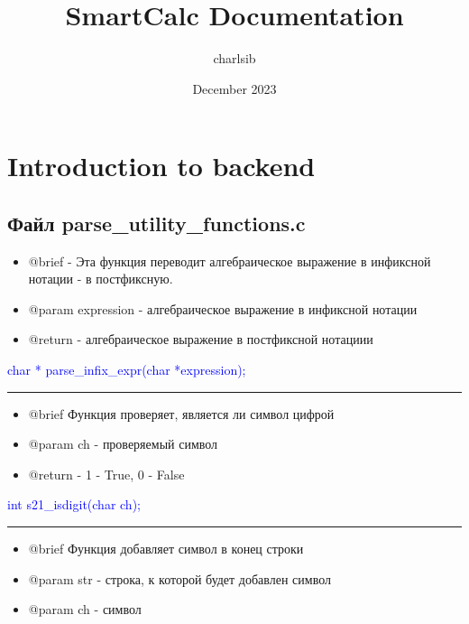 \documentclass{article}
\title{SmartCalc Documentation}
\date{December 2023}
\author{charlsib}
\begin{document}
\maketitle


\section{Introduction to backend}

\subsection{\textbf{Файл parse\_utility\_functions.c}}

\begin{itemize}
    \item  @brief - Эта функция переводит алгебраическое выражение в инфиксной нотации - в постфиксную.

    \item  @param expression - алгебраическое выражение в инфиксной нотации

    \item  @return  - алгебраическое выражение в постфиксной нотациии
\end{itemize}

\textcolor{blue}{char * parse\_infix\_expr(char *expression);}


{\color{red} \rule{\linewidth}{0.5mm}}

\begin{itemize}
\item @brief Функция проверяет, является ли символ цифрой

\item @param ch - проверяемый символ

\item @return - 1 - True, 0 - False
\end{itemize}

\textcolor{blue}{int s21\_isdigit(char ch);}


{\color{red} \rule{\linewidth}{0.5mm}}

\begin{itemize}
\item @brief Функция добавляет символ в конец строки

\item @param str - строка, к которой будет добавлен символ

\item @param ch - символ
\end{itemize}
\end{document}
